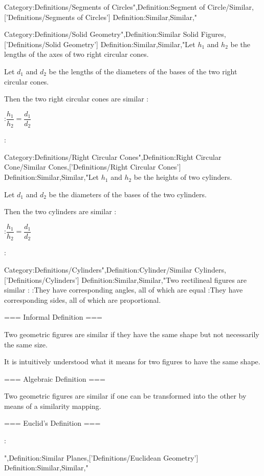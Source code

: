 Category:Definitions/Segments of Circles",Definition:Segment of Circle/Similar,['Definitions/Segments of Circles']
Definition:Similar,Similar,"



Category:Definitions/Solid Geometry",Definition:Similar Solid Figures,['Definitions/Solid Geometry']
Definition:Similar,Similar,"Let $h_1$ and $h_2$ be the lengths of the axes of two right circular cones.

Let $d_1$ and $d_2$ be the lengths of the diameters of the bases of the two right circular cones.

Then the two right circular cones are similar :

:$\dfrac {h_1} {h_2} = \dfrac {d_1} {d_2}$



:



Category:Definitions/Right Circular Cones",Definition:Right Circular Cone/Similar Cones,['Definitions/Right Circular Cones']
Definition:Similar,Similar,"Let $h_1$ and $h_2$ be the heights of two cylinders.

Let $d_1$ and $d_2$ be the diameters of the bases of the two cylinders.

Then the two cylinders are similar :

:$\dfrac {h_1} {h_2} = \dfrac {d_1} {d_2}$



:



Category:Definitions/Cylinders",Definition:Cylinder/Similar Cylinders,['Definitions/Cylinders']
Definition:Similar,Similar,"Two rectilineal figures are similar :
:They have corresponding angles, all of which are equal
:They have corresponding sides, all of which are proportional.


=== Informal Definition ===

Two geometric figures are similar if they have the same shape but not necessarily the same size.

It is intuitively understood what it means for two figures to have the same shape.


=== Algebraic Definition ===

Two geometric figures are similar if one can be transformed into the other by means of a similarity mapping.


=== Euclid's Definition ===


:

",Definition:Similar Planes,['Definitions/Euclidean Geometry']
Definition:Similar,Similar,"

